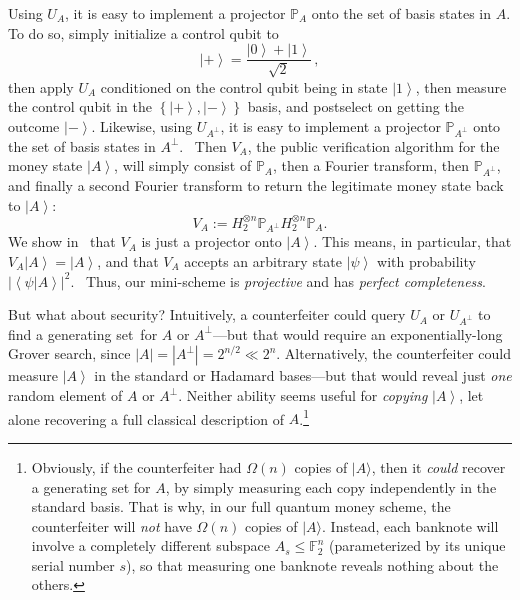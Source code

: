 Using $U_{A}$, it is easy to implement a projector $\mathbb{P}_{A}$ onto the
set of basis states in $A$. To do so, simply initialize a control qubit to
\[
\left\vert +\right\rangle =\frac{\left\vert 0\right\rangle +\left\vert
1\right\rangle }{\sqrt{2}}\,,
\]
then apply $U_{A}$ conditioned on the control
qubit being in state $\left\vert 1\right\rangle $, then measure the control
qubit in the $\left\{  \left\vert +\right\rangle ,\left\vert -\right\rangle
\right\}  $ basis, and postselect on getting the outcome $\left\vert
-\right\rangle $. Likewise, using $U_{A^{\bot}}$, it is easy to implement a
projector $\mathbb{P}_{A^{\bot}}$ onto the set of basis states in $A^{\bot}$.
\ Then $V_{A}$, the public verification algorithm for the money state
$\left\vert A\right\rangle $, will simply consist of $\mathbb{P}_{A}$, then a
Fourier transform, then $\mathbb{P}_{A^{\bot}}$, and finally a second Fourier
transform to return the legitimate money state back to $\left\vert
A\right\rangle $:%
\[
V_{A}:=H_{2}^{\otimes n}\mathbb{P}_{A^{\bot}}H_{2}^{\otimes n}\mathbb{P}_{A}.
\]
We show in \ that $V_{A}$ is just a projector onto
$\left\vert A\right\rangle $. This means, in particular, that $V_{A}%
\left\vert A\right\rangle =\left\vert A\right\rangle $, and that $V_{A}%
$ accepts an arbitrary state $\left\vert \psi\right\rangle $ with
probability $\left\vert \left\langle \psi|A\right\rangle \right\vert ^{2}$.
\ Thus, our mini-scheme is \emph{projective} and has \emph{perfect
completeness}.

But what about security? Intuitively, a counterfeiter could query $U_{A}$ or
$U_{A^{\bot}}$ to find a generating set\ for $A$ or $A^{\bot}$---but that
would require an exponentially-long Grover search, since $\left\vert
A\right\vert =\left\vert A^{\bot}\right\vert =2^{n/2}\ll2^{n}$. Alternatively,
the counterfeiter could measure $\left\vert A\right\rangle $ in the standard
or Hadamard bases---but that would reveal just \emph{one} random element of
$A$ or $A^{\bot}$. Neither ability seems useful for \emph{copying}
$\left\vert A\right\rangle $, let alone recovering a full classical
description of $A$.\footnote{Obviously, if the counterfeiter had
$\Omega(  n)$ copies of $\vert A\rangle $, then it
\emph{could} recover a generating set for $A$, by simply measuring each copy
independently in the standard basis. That is why, in our full quantum money
scheme, the counterfeiter will \emph{not} have $\Omega(n)$ copies of $\vert A\rangle$. Instead, each banknote will
involve a completely different subspace $A_{s}\leq\mathbb{F}_{2}^{n}$
(parameterized by its unique serial number $s$), so that measuring one
banknote reveals nothing about the others.}

